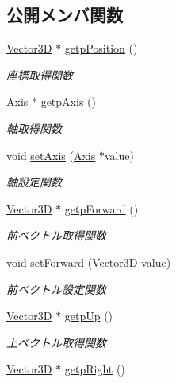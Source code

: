 \subsection*{公開メンバ関数}
\begin{DoxyCompactItemize}
\item 
\mbox{\hyperlink{class_vector3_d}{Vector3D}} $\ast$ \mbox{\hyperlink{class_o_b_b_ae2e378f96e4b3899e133ce50b91155a8}{getp\+Position}} ()
\begin{DoxyCompactList}\small\item\em 座標取得関数 \end{DoxyCompactList}\item 
\mbox{\hyperlink{class_axis}{Axis}} $\ast$ \mbox{\hyperlink{class_o_b_b_a4a9ca4f8a93f761eef0b75709a8903a2}{getp\+Axis}} ()
\begin{DoxyCompactList}\small\item\em 軸取得関数 \end{DoxyCompactList}\item 
void \mbox{\hyperlink{class_o_b_b_a72a04d773f08608f2cd3542f505dee94}{set\+Axis}} (\mbox{\hyperlink{class_axis}{Axis}} $\ast$value)
\begin{DoxyCompactList}\small\item\em 軸設定関数 \end{DoxyCompactList}\item 
\mbox{\hyperlink{class_vector3_d}{Vector3D}} $\ast$ \mbox{\hyperlink{class_o_b_b_a57d13d599712dae38ae6bad1ee564541}{getp\+Forward}} ()
\begin{DoxyCompactList}\small\item\em 前ベクトル取得関数 \end{DoxyCompactList}\item 
void \mbox{\hyperlink{class_o_b_b_add9c062d91d4226f7cabf484e104d259}{set\+Forward}} (\mbox{\hyperlink{class_vector3_d}{Vector3D}} value)
\begin{DoxyCompactList}\small\item\em 前ベクトル設定関数 \end{DoxyCompactList}\item 
\mbox{\hyperlink{class_vector3_d}{Vector3D}} $\ast$ \mbox{\hyperlink{class_o_b_b_ac955d385e7348aae70f3bb2d3c6a48e9}{getp\+Up}} ()
\begin{DoxyCompactList}\small\item\em 上ベクトル取得関数 \end{DoxyCompactList}\item 
\mbox{\hyperlink{class_vector3_d}{Vector3D}} $\ast$ \mbox{\hyperlink{class_o_b_b_a37cef2f1f73bd19c417fead561ec6bf0}{getp\+Right}} ()

\end{DoxyCompactItemize}
